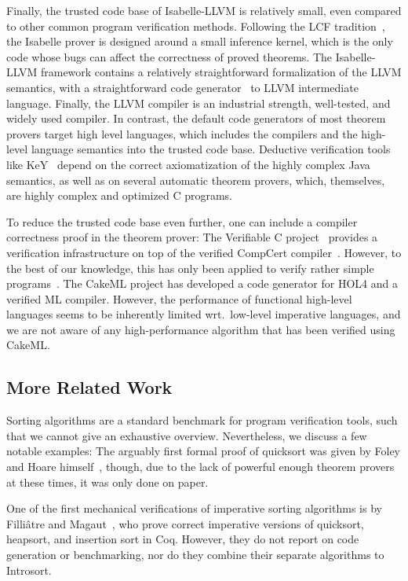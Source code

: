 \documentclass[sigplan,10pt,anonymous,review]{acmart}\settopmatter{printfolios=true,printccs=false,printacmref=false}
\theoremstyle{definition}
\begin{document}
Finally, the trusted code base of Isabelle-LLVM is relatively small, even compared to other common program verification methods.
Following the LCF tradition~\cite{gordon-et-al-1979}, the Isabelle prover is designed around a small inference kernel, which is the only code
whose bugs can affect the correctness of proved theorems.
The Isabelle-LLVM framework contains a relatively straightforward formalization of the LLVM semantics, with a straightforward code
generator~\cite{La19-llvm} to LLVM intermediate language.
Finally, the LLVM compiler is an industrial strength, well-tested, and widely used compiler.
In contrast, the default code generators of most theorem provers target high level languages, which includes the
compilers and the high-level language semantics into the trusted code base.
Deductive verification tools like KeY~\cite{BHS07} depend on the correct axiomatization of the highly complex Java semantics,
as well as on several automatic theorem provers, which, themselves, are highly complex and optimized C programs.

To reduce the trusted code base even further, one can include a compiler correctness proof in the theorem prover:
The Verifiable C project~\cite{App14} provides a verification infrastructure on top of the verified CompCert compiler~\cite{BL09}.
However, to the best of our knowledge, this has only been applied to verify rather simple programs~\cite{CBGD18}.
The CakeML project \cite{KTMK19,MyOw14} has developed a code generator for HOL4 and a verified ML compiler.
However, the performance of functional high-level languages seems to be inherently limited wrt.\ low-level imperative languages,
and we are not aware of any high-performance algorithm that has been verified using CakeML.


\subsection{More Related Work}
Sorting algorithms are a standard benchmark for program verification tools, such that we cannot give an exhaustive overview.
Nevertheless, we discuss a few notable examples: The arguably first formal proof of quicksort was given
by Foley and Hoare himself~\cite{FoHoa71}, though, due to the lack of powerful enough theorem provers at these times,
it was only done on paper.

One of the first mechanical verifications of imperative sorting algorithms is by
Filli{\^a}tre and Magaut~\cite{FiMa99}, who prove correct imperative versions of quicksort, heapsort, and insertion sort in Coq.
However, they do not report on code generation or benchmarking, nor do they combine their separate algorithms to Introsort.
\end{document}
